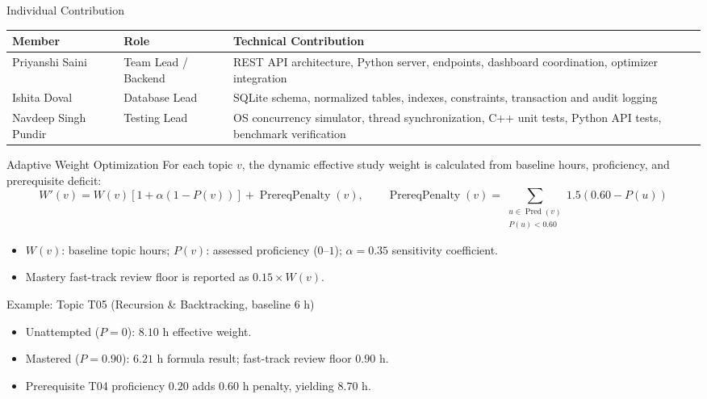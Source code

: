 \documentclass[aspectratio=169,11pt]{beamer}
\begin{document}
\begin{frame}{Individual Contribution}
\scriptsize
\begin{center}
\renewcommand{\arraystretch}{1.35}
\begin{tabularx}{.96\textwidth}{@{}p{2.1cm}p{2.3cm}X@{}}
\toprule
\textbf{Member} & \textbf{Role} & \textbf{Technical Contribution}\\
\midrule
Priyanshi Saini & Team Lead / Backend & REST API architecture, Python server, endpoints, dashboard coordination, optimizer integration\\
Ishita Doval & Database Lead & SQLite schema, normalized tables, indexes, constraints, transaction and audit logging\\
Navdeep Singh Pundir & Testing Lead & OS concurrency simulator, thread synchronization, C++ unit tests, Python API tests, benchmark verification\\
\bottomrule
\end{tabularx}
\end{center}
\end{frame}

\begin{frame}{Adaptive Weight Optimization}
\footnotesize
\setlength{\abovedisplayskip}{3pt}
\setlength{\belowdisplayskip}{3pt}
For each topic \(v\), the dynamic effective study weight is calculated from baseline hours, proficiency, and prerequisite deficit:
\[
W'(v)=W(v)\left[1+\alpha\left(1-P(v)\right)\right]+\operatorname{PrereqPenalty}(v), \qquad
\operatorname{PrereqPenalty}(v)=\sum_{\substack{u\in\operatorname{Pred}(v)\\P(u)<0.60}}1.5\left(0.60-P(u)\right)
\]
\begin{itemize}\itemsep1pt\parskip0pt
\item \(W(v)\): baseline topic hours; \(P(v)\): assessed proficiency (\(0\text{--}1\)); \(\alpha=0.35\) sensitivity coefficient.
\item Mastery fast-track review floor is reported as \(0.15\times W(v)\).
\end{itemize}
\vspace{-1mm}
\begin{block}{Example: Topic T05 (Recursion \& Backtracking, baseline 6 h)}
\begin{itemize}\itemsep1pt\parskip0pt
\item Unattempted (\(P=0\)): \(8.10\text{ h}\) effective weight.
\item Mastered (\(P=0.90\)): \(6.21\text{ h}\) formula result; fast-track review floor \(0.90\text{ h}\).
\item Prerequisite T04 proficiency \(0.20\) adds \(0.60\text{ h}\) penalty, yielding \(8.70\text{ h}\).
\end{itemize}
\end{block}
\end{frame}
\end{document}

